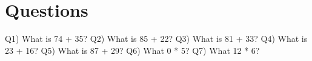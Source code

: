 \documentclass{article}%
\begin{document}
%
\normalsize%
\section{Questions}%
\label{sec:Questions}%
Q1)  What is 74 + 35?%
\newline%
\newline%
\newline%
\newline%
\newline%
\newline%
\newline%
%
Q2)  What is 85 + 22?%
\newline%
\newline%
\newline%
\newline%
\newline%
\newline%
\newline%
%
Q3)  What is 81 + 33?%
\newline%
\newline%
\newline%
\newline%
\newline%
\newline%
\newline%
%
Q4)  What is 23 + 16?%
\newline%
\newline%
\newline%
\newline%
\newline%
\newline%
\newline%
%
Q5)  What is 87 + 29?%
\newline%
\newline%
\newline%
\newline%
\newline%
\newline%
\newline%
%
Q6)  What 0 * 5?%
\newline%
\newline%
\newline%
\newline%
\newline%
\newline%
\newline%
%
Q7)  What 12 * 6?%
\newline%
\newline%
\newline%
\end{document}
